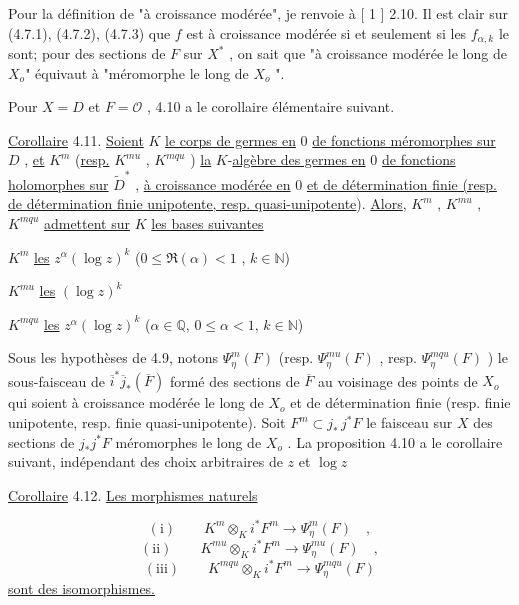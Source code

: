 Pour la définition de "à croissance modérée", je renvoie à [ 1 ] 2.10. Il est clair sur (4.7.1), (4.7.2), (4.7.3) que $f$ est à croissance modérée si et seulement si les $f_{\alpha,k}$ le sont; pour des sections de $F$ sur $X^*$ , on sait
que "à croissance modérée le long de $X_o$" équivaut à "méromorphe le long de $X_o$ ".

Pour $X = D$ et $F = \mathcal{O}$ , 4.10 a le corollaire élémentaire suivant.

\underline{Corollaire} 4.11. \underline{Soient} $K$ \underline{le corps de germes en} $0$ \underline{de fonctions méromorphes sur} $D$ , \underline{et} $K^m$ (\underline{resp.} $K^{mu}$ , $K^{mqu}$ ) \underline{la} $K$-\underline{algèbre des germes en} $0$ \underline{de fonctions holomorphes sur} $\widetilde{D}^*$ , \underline{à croissance modérée en} $0$ \underline{et de détermination finie (resp. de détermination finie unipotente, resp. quasi-unipotente}). \underline{Alors}, $K^m$ , $K^{mu}$ , $K^{mqu}$ \underline{admettent sur} $K$ \underline{les bases suivantes}

$K^m$ \qquad \underline{les} \quad $z^\alpha (\log z)^k$ \qquad\qquad\qquad ($0 \leq \Re(\alpha) < 1$ , $k \in \mathbb{N}$)

$K^{mu}$ \qquad \underline{les} \quad $(\log z)^k$

$K^{mqu}$ \qquad \underline{les} \quad $z^\alpha (\log z)^k$ \qquad\qquad\qquad ($\alpha \in \mathbb{Q}$, $0 \leq \alpha < 1$, $k \in \mathbb{N}$)

Sous les hypothèses de 4.9, notons $\Psi^m_\eta(F)$ (resp. $\Psi^{mu}_\eta(F)$ , resp. $\Psi^{mqu}_\eta(F)$ ) le sous-faisceau de $\overline{i}^* \overline{j}_*(\overline{F})$ formé des sections de $\overline{F}$ au voisinage des points de $X_o$ qui soient à croissance modérée le long de $X_o$ et de détermination finie (resp. finie unipotente, resp. finie quasi-unipotente). Soit $F^m \subset j_* \, j^* F$ le faisceau sur $X$ des sections de $j_* j^* F$ méromorphes le long de $X_o$ . La proposition 4.10 a le corollaire suivant, indépendant des choix arbitraires de $z$ et $\log z$

\underline{Corollaire} 4.12. \underline{Les morphismes naturels}

\begin{equation*}
\mathrm{(i)} \qquad K^m \otimes_K i^* F^m \longrightarrow \Psi^m_\eta(F) \quad ,
\end{equation*}
\begin{equation*}
\mathrm{(ii)} \qquad K^{mu} \otimes_K i^* F^m \longrightarrow \Psi^{mu}_\eta(F) \quad ,
\end{equation*}
\begin{equation*}
\mathrm{(iii)} \qquad K^{mqu} \otimes_K i^* F^m \longrightarrow \Psi^{mqu}_\eta(F)
\end{equation*}
\underline{sont des isomorphismes.}


